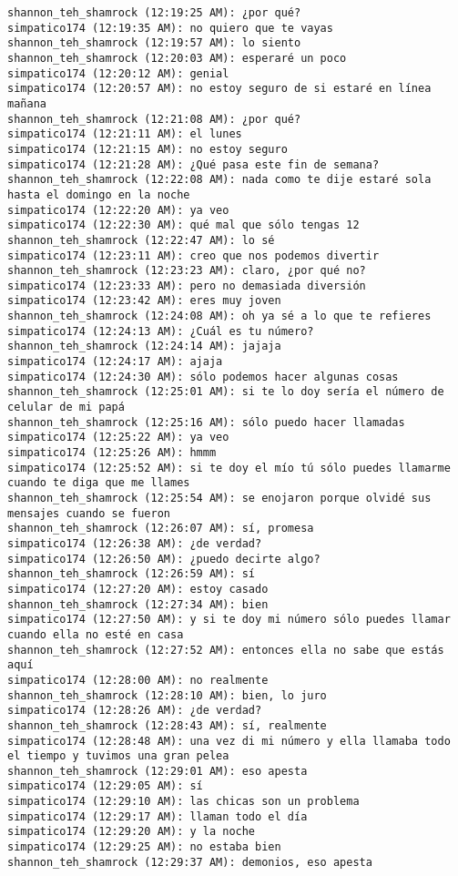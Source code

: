 \begin{verbatim}
shannon_teh_shamrock (12:19:25 AM): ¿por qué?
simpatico174 (12:19:35 AM): no quiero que te vayas
shannon_teh_shamrock (12:19:57 AM): lo siento
shannon_teh_shamrock (12:20:03 AM): esperaré un poco 
simpatico174 (12:20:12 AM): genial
simpatico174 (12:20:57 AM): no estoy seguro de si estaré en línea mañana
shannon_teh_shamrock (12:21:08 AM): ¿por qué?
simpatico174 (12:21:11 AM): el lunes
simpatico174 (12:21:15 AM): no estoy seguro
simpatico174 (12:21:28 AM): ¿Qué pasa este fin de semana?
shannon_teh_shamrock (12:22:08 AM): nada como te dije estaré sola hasta el domingo en la noche
simpatico174 (12:22:20 AM): ya veo
simpatico174 (12:22:30 AM): qué mal que sólo tengas 12
shannon_teh_shamrock (12:22:47 AM): lo sé
simpatico174 (12:23:11 AM): creo que nos podemos divertir
shannon_teh_shamrock (12:23:23 AM): claro, ¿por qué no?
simpatico174 (12:23:33 AM): pero no demasiada diversión
simpatico174 (12:23:42 AM): eres muy joven
shannon_teh_shamrock (12:24:08 AM): oh ya sé a lo que te refieres
simpatico174 (12:24:13 AM): ¿Cuál es tu número?
shannon_teh_shamrock (12:24:14 AM): jajaja
simpatico174 (12:24:17 AM): ajaja
simpatico174 (12:24:30 AM): sólo podemos hacer algunas cosas
shannon_teh_shamrock (12:25:01 AM): si te lo doy sería el número de celular de mi papá
shannon_teh_shamrock (12:25:16 AM): sólo puedo hacer llamadas
simpatico174 (12:25:22 AM): ya veo
simpatico174 (12:25:26 AM): hmmm
simpatico174 (12:25:52 AM): si te doy el mío tú sólo puedes llamarme cuando te diga que me llames
shannon_teh_shamrock (12:25:54 AM): se enojaron porque olvidé sus mensajes cuando se fueron
shannon_teh_shamrock (12:26:07 AM): sí, promesa
simpatico174 (12:26:38 AM): ¿de verdad?
simpatico174 (12:26:50 AM): ¿puedo decirte algo?
shannon_teh_shamrock (12:26:59 AM): sí
simpatico174 (12:27:20 AM): estoy casado
shannon_teh_shamrock (12:27:34 AM): bien
simpatico174 (12:27:50 AM): y si te doy mi número sólo puedes llamar cuando ella no esté en casa
shannon_teh_shamrock (12:27:52 AM): entonces ella no sabe que estás aquí
simpatico174 (12:28:00 AM): no realmente
shannon_teh_shamrock (12:28:10 AM): bien, lo juro
simpatico174 (12:28:26 AM): ¿de verdad?
shannon_teh_shamrock (12:28:43 AM): sí, realmente
simpatico174 (12:28:48 AM): una vez di mi número y ella llamaba todo el tiempo y tuvimos una gran pelea
shannon_teh_shamrock (12:29:01 AM): eso apesta
simpatico174 (12:29:05 AM): sí
simpatico174 (12:29:10 AM): las chicas son un problema
simpatico174 (12:29:17 AM): llaman todo el día
simpatico174 (12:29:20 AM): y la noche
simpatico174 (12:29:25 AM): no estaba bien
shannon_teh_shamrock (12:29:37 AM): demonios, eso apesta

\end{verbatim}
